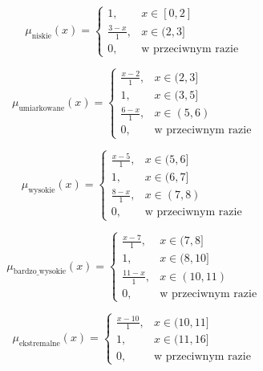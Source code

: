 \documentclass{article}
\begin{document}
\begin{enumerate}
\begin{equation}
\mu_{\text{niskie}}(x) =
\begin{cases}
1, & x \in [0, 2] \\
\frac{3 - x}{1}, & x \in (2, 3] \\
0, & \text{w przeciwnym razie}
\end{cases}
\end{equation}

\begin{equation}
\mu_{\text{umiarkowane}}(x) =
\begin{cases}
\frac{x - 2}{1}, & x \in (2, 3] \\
1, & x \in (3, 5] \\
\frac{6 - x}{1}, & x \in (5, 6) \\
0, & \text{w przeciwnym razie}
\end{cases}
\end{equation}

\begin{equation}
\mu_{\text{wysokie}}(x) =
\begin{cases}
\frac{x - 5}{1}, & x \in (5, 6] \\
1, & x \in (6, 7] \\
\frac{8 - x}{1}, & x \in (7, 8) \\
0, & \text{w przeciwnym razie}
\end{cases}
\end{equation}

\begin{equation}
\mu_{\text{bardzo\_wysokie}}(x) =
\begin{cases}
\frac{x - 7}{1}, & x \in (7, 8] \\
1, & x \in (8, 10] \\
\frac{11 - x}{1}, & x \in (10, 11) \\
0, & \text{w przeciwnym razie}
\end{cases}
\end{equation}

\begin{equation}
\mu_{\text{ekstremalne}}(x) =
\begin{cases}
\frac{x - 10}{1}, & x \in (10, 11] \\
1, & x \in (11, 16] \\
0, & \text{w przeciwnym razie}
\end{cases}
\end{equation}


\end{enumerate}
\end{document}
